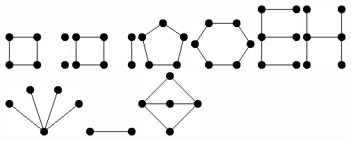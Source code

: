\documentclass[11pt,paper=b5,footinclude,headinclude]{scrbook} %
\begin{document}
{\includegraphics[scale=0.5,frame]{smallGraphs/g_C4U2K1.png}     
\includegraphics[scale=0.5,frame]{smallGraphs/g_C4UP2.png}     
\includegraphics[scale=0.5,frame]{smallGraphs/g_C5.png}     
\includegraphics[scale=0.5,frame]{smallGraphs/g_C6.png}     
\includegraphics[scale=0.5,frame]{smallGraphs/g_E.png}     
\includegraphics[scale=0.5,frame]{smallGraphs/g_H.png}     
\includegraphics[scale=0.5,frame]{smallGraphs/g_K14.png}     
\includegraphics[scale=0.5,frame]{smallGraphs/g_K2.png}     
\includegraphics[scale=0.5,frame]{smallGraphs/g_K23.png}     
}
\end{document}
